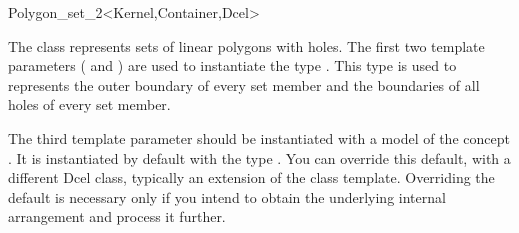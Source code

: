 \ccRefPageBegin

\begin{ccRefClass}{Polygon_set_2<Kernel,Container,Dcel>}

\ccThreeToTwo
    
\ccDefinition

The class \ccRefName{} represents sets of linear polygons with holes.
The first two template parameters ( and ) 
are used to instantiate the type . 
This type is used to represents the outer boundary of every set member
and the boundaries of all holes of every set member.

The third template parameter  should be instantiated with a
model of the concept . It is instantiated
by default with the type . You can override 
this default, with a different {\sc Dcel} class, typically an extension
of the  class template. Overriding the default is 
necessary only if you intend to obtain the underlying internal arrangement 
and process it further.


\ccInheritsFrom

\ccSeeAlso
  \\

\end{ccRefClass}
\ccRefPageEnd
